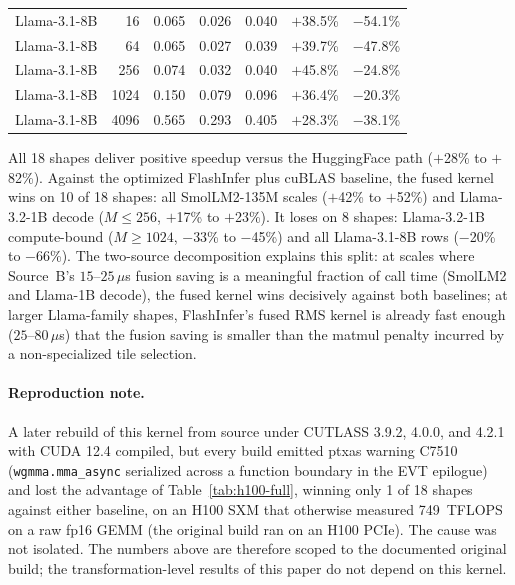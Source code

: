 \documentclass{article}
\begin{document}
\begin{table}[h!]
\begin{tabular}{l r r r r r r}
Llama-3.1-8B & 16   & 0.065 & 0.026 & 0.040 & $+$38.5\% & $-$54.1\% \\
Llama-3.1-8B & 64   & 0.065 & 0.027 & 0.039 & $+$39.7\% & $-$47.8\% \\
Llama-3.1-8B & 256  & 0.074 & 0.032 & 0.040 & $+$45.8\% & $-$24.8\% \\
Llama-3.1-8B & 1024 & 0.150 & 0.079 & 0.096 & $+$36.4\% & $-$20.3\% \\
Llama-3.1-8B & 4096 & 0.565 & 0.293 & 0.405 & $+$28.3\% & $-$38.1\% \\
\hline
\end{tabular}
\end{table}

All 18 shapes deliver positive speedup versus the HuggingFace path ($+$28\% to $+$82\%). Against the optimized FlashInfer plus cuBLAS baseline, the fused kernel wins on 10 of 18 shapes: all SmolLM2-135M scales ($+$42\% to $+$52\%) and Llama-3.2-1B decode ($M \leq 256$, $+$17\% to $+$23\%). It loses on 8 shapes: Llama-3.2-1B compute-bound ($M \geq 1024$, $-$33\% to $-$45\%) and all Llama-3.1-8B rows ($-$20\% to $-$66\%). The two-source decomposition explains this split: at scales where Source~B's $15$--$25\,\mu$s fusion saving is a meaningful fraction of call time (SmolLM2 and Llama-1B decode), the fused kernel wins decisively against both baselines; at larger Llama-family shapes, FlashInfer's fused RMS kernel is already fast enough ($25$--$80\,\mu$s) that the fusion saving is smaller than the matmul penalty incurred by a non-specialized tile selection.

\paragraph{Reproduction note.} A later rebuild of this kernel from source under CUTLASS 3.9.2, 4.0.0, and 4.2.1 with CUDA 12.4 compiled, but every build emitted ptxas warning C7510 (\texttt{wgmma.mma\_async} serialized across a function boundary in the EVT epilogue) and lost the advantage of Table~\ref{tab:h100-full}, winning only 1 of 18 shapes against either baseline, on an H100 SXM that otherwise measured 749~TFLOPS on a raw fp16 GEMM (the original build ran on an H100 PCIe). The cause was not isolated. The numbers above are therefore scoped to the documented original build; the transformation-level results of this paper do not depend on this kernel.
\end{document}
